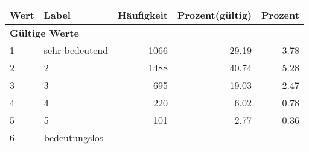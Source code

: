      \begin{longtable}{lXrrr}
     \toprule
     \textbf{Wert} & \textbf{Label} & \textbf{Häufigkeit} & \textbf{Prozent(gültig)} & \textbf{Prozent} \\
     \endhead
     \midrule
     \multicolumn{5}{l}{\textbf{Gültige Werte}}\\

     1 &
     \multicolumn{1}{X}{ sehr bedeutend   } &


       \num{1066} &
       \num[round-mode=places,round-precision=2]{29,19} &
         \num[round-mode=places,round-precision=2]{3,78} \\

     2 &
     \multicolumn{1}{X}{ 2   } &


       \num{1488} &
       \num[round-mode=places,round-precision=2]{40,74} &
         \num[round-mode=places,round-precision=2]{5,28} \\

     3 &
     \multicolumn{1}{X}{ 3   } &


       \num{695} &
       \num[round-mode=places,round-precision=2]{19,03} &
         \num[round-mode=places,round-precision=2]{2,47} \\

     4 &
     \multicolumn{1}{X}{ 4   } &


       \num{220} &
       \num[round-mode=places,round-precision=2]{6,02} &
         \num[round-mode=places,round-precision=2]{0,78} \\

     5 &
     \multicolumn{1}{X}{ 5   } &


       \num{101} &
       \num[round-mode=places,round-precision=2]{2,77} &
         \num[round-mode=places,round-precision=2]{0,36} \\

     6 &
     \multicolumn{1}{X}{ bedeutungslos   } &



\end{longtable}
